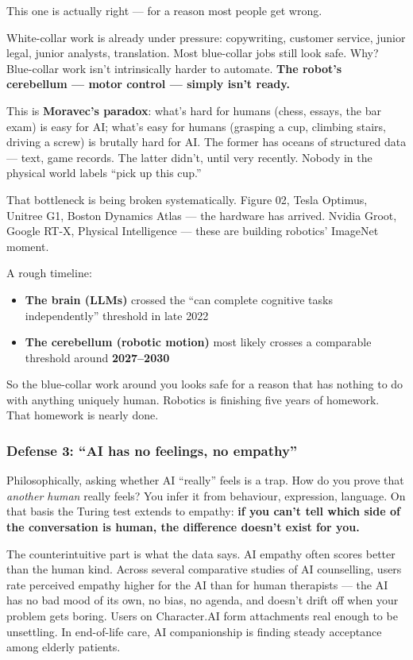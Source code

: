 \documentclass[11pt,a4paper]{article}
\begin{document}
This one is actually right --- for a reason most people get wrong.

White-collar work is already under pressure: copywriting, customer service, junior legal, junior analysts, translation. Most blue-collar jobs still look safe. Why? Blue-collar work isn't intrinsically harder to automate. \textbf{The robot's cerebellum --- motor control --- simply isn't ready.}

This is \textbf{Moravec's paradox}: what's hard for humans (chess, essays, the bar exam) is easy for AI; what's easy for humans (grasping a cup, climbing stairs, driving a screw) is brutally hard for AI. The former has oceans of structured data --- text, game records. The latter didn't, until very recently. Nobody in the physical world labels ``pick up this cup.''

That bottleneck is being broken systematically. Figure 02, Tesla Optimus, Unitree G1, Boston Dynamics Atlas --- the hardware has arrived. Nvidia Groot, Google RT-X, Physical Intelligence --- these are building robotics' ImageNet moment.

A rough timeline:

\begin{itemize}
  \item \textbf{The brain (LLMs)} crossed the ``can complete cognitive tasks independently'' threshold in late 2022
  \item \textbf{The cerebellum (robotic motion)} most likely crosses a comparable threshold around \textbf{2027--2030}
\end{itemize}

So the blue-collar work around you looks safe for a reason that has nothing to do with anything uniquely human. Robotics is finishing five years of homework. That homework is nearly done.

\subsubsection{Defense 3: ``AI has no feelings, no empathy''}

Philosophically, asking whether AI ``really'' feels is a trap. How do you prove that \textit{another human} really feels? You infer it from behaviour, expression, language. On that basis the Turing test extends to empathy: \textbf{if you can't tell which side of the conversation is human, the difference doesn't exist for you.}

The counterintuitive part is what the data says. AI empathy often scores better than the human kind. Across several comparative studies of AI counselling, users rate perceived empathy higher for the AI than for human therapists --- the AI has no bad mood of its own, no bias, no agenda, and doesn't drift off when your problem gets boring. Users on Character.AI form attachments real enough to be unsettling. In end-of-life care, AI companionship is finding steady acceptance among elderly patients.
\end{document}
